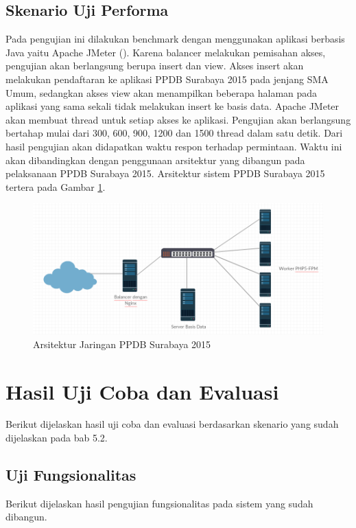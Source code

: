 \documentclass{ta-its}
\begin{document}
			\subsection{Skenario Uji Performa}
				Pada pengujian ini dilakukan benchmark dengan menggunakan aplikasi berbasis Java yaitu Apache JMeter (). Karena balancer melakukan pemisahan akses, pengujian akan berlangsung berupa insert dan view. Akses insert akan melakukan pendaftaran ke aplikasi PPDB Surabaya 2015 pada jenjang SMA Umum, sedangkan akses view akan menampilkan beberapa halaman pada aplikasi yang sama sekali tidak melakukan insert ke basis data. Apache JMeter akan membuat thread untuk setiap akses ke aplikasi. Pengujian akan berlangsung bertahap mulai dari 300, 600, 900, 1200 dan 1500 thread dalam satu detik. Dari hasil pengujian akan didapatkan waktu respon terhadap permintaan. Waktu ini akan dibandingkan dengan penggunaan arsitektur yang dibangun pada pelaksanaan PPDB Surabaya 2015. Arsitektur sistem PPDB Surabaya 2015 tertera pada Gambar \ref{gambarArsitekturPPDB}.
		
				\begin{figure}[h] %
					\centering
					\includegraphics[width=\linewidth]{contoh_img/arsitekturppdb}
					\caption{Arsitektur Jaringan PPDB Surabaya 2015}
					\label{gambarArsitekturPPDB}
				\end{figure}
		
		\section{Hasil Uji Coba dan Evaluasi}
			Berikut dijelaskan hasil uji coba dan evaluasi berdasarkan skenario yang sudah dijelaskan pada bab 5.2.
			
			\subsection{Uji Fungsionalitas}
				Berikut dijelaskan hasil pengujian fungsionalitas pada sistem yang sudah dibangun.
				
\end{document}
